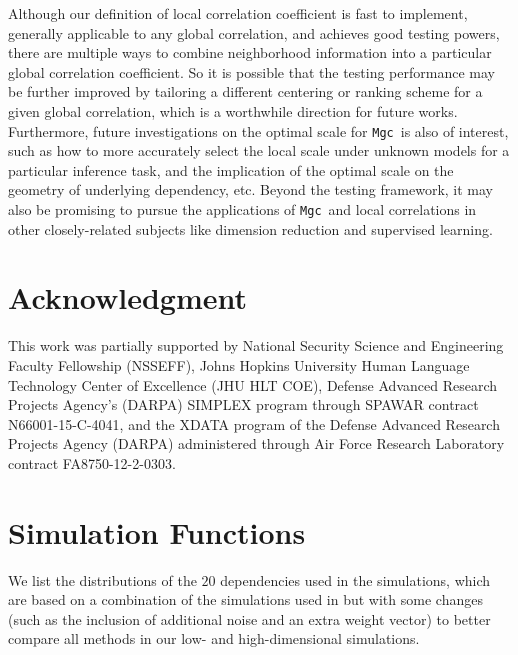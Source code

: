 \documentclass[11pt]{article}
\newcommand{\note}[2][]{\added[#1,remark={#2}]{}}
\providecommand{\sct}[1]{{\sc \texttt{#1}}}
\newcommand{\Mgc}{\sct{Mgc}}
\newcommand{\cs}[1]{{\note{cs: #1}}}
\begin{document}
Although our definition of local correlation coefficient is fast to implement, generally applicable to any global correlation, and achieves good testing powers, there are multiple ways to combine neighborhood information into a particular global correlation coefficient. So it is possible that the testing performance may be further improved by tailoring a different centering or ranking scheme for a given global correlation, which is a worthwhile direction for future works. Furthermore, future investigations on the optimal scale for \Mgc~is also of interest, such as how to more accurately select the local scale under unknown models for a particular inference task, and the implication of the optimal scale on the geometry of underlying dependency, etc. Beyond the testing framework, it may also be promising to pursue the applications of \Mgc~and local correlations in other closely-related subjects like dimension reduction and supervised learning. \cs{choosing the metric, using the concept for other testing and prediction domains, eg, using the scales for guidance in constructing prediction engines.}


\section*{Acknowledgment}
This work was partially supported by 
% 
National Security Science and Engineering Faculty Fellowship (NSSEFF), 
% 
Johns Hopkins University Human Language Technology Center of Excellence (JHU HLT COE), 
% 
Defense Advanced Research Projects Agency's (DARPA) SIMPLEX program through SPAWAR contract N66001-15-C-4041, 
% 
and the XDATA program of the Defense Advanced Research Projects Agency (DARPA) administered through Air Force Research Laboratory contract FA8750-12-2-0303.



\appendix
\setcounter{figure}{0}
\renewcommand\thefigure{A\arabic{figure}} 

\section{Simulation Functions}
\label{appen:function}

We list the distributions of the $20$ dependencies used in the simulations, which are based on a combination of the simulations used in \cite{SzekelyRizzoBakirov2007, SimonTibshirani2012, SimonTibshirani2012, GorfineHellerHeller2012} but with some changes (such as the inclusion of additional noise and an extra weight vector) to better compare all methods in our low- and high-dimensional simulations.
\end{document}
